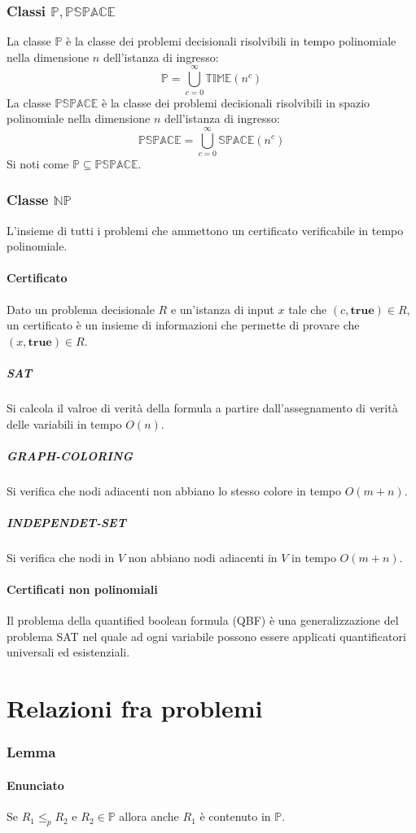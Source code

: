 \subsubsection{Classi $\mathbf{\mathbb{P}}, \mathbf{\mathbb{PSPACE}}$}
La classe $\mathbb{P}$ \`e la classe dei problemi decisionali risolvibili in tempo polinomiale nella dimensione $n$ dell'istanza di ingresso:
$$\mathbb{P} = \bigcup\limits_{c=0}^\infty\mathbb{TIME}(n^c)$$
La classe $\mathbb{PSPACE}$ \`e la classe dei problemi decisionali risolvibili in spazio polinomiale nella dimensione $n$ dell'istanza di ingresso:
$$\mathbb{PSPACE}=\bigcup\limits_{c=0}^\infty\mathbb{SPACE}(n^c)$$
Si noti come $\mathbb{P}\subseteq\mathbb{PSPACE}$.
\subsubsection{Classe $\mathbf{\mathbb{NP}}$}
L'insieme di tutti i problemi che ammettono un certificato verificabile in tempo polinomiale.
\paragraph{Certificato}
Dato un problema decisionale $R$ e un'istanza di input $x$ tale che $(c, \mathbf{true})\in R$, un certificato \`e un insieme di informazioni che permette di provare che $(x, 
\mathbf{true})\in R$.
\subparagraph{SAT}
Si calcola il valroe di verit\`a della formula a partire dall'assegnamento di verit\`a delle variabili in tempo $O(n)$.
\subparagraph{GRAPH-COLORING}
Si verifica che nodi adiacenti non abbiano lo stesso colore in tempo $O(m+n)$.
\subparagraph{INDEPENDET-SET}	
Si verifica che nodi in $V$ non abbiano nodi adiacenti in $V$ in tempo $O(m+n)$.
\paragraph{Certificati non polinomiali}
Il problema della quantified boolean formula (QBF) \`e una generalizzazione del problema SAT nel quale ad ogni variabile possono essere applicati quantificatori universali ed 
esistenziali.
\section{Relazioni fra problemi}
\subsubsection{Lemma}
\paragraph{Enunciato}
Se $R_1\le_p R_2$ e $R_2\in\mathbb{P}$ allora anche $R_1$ \`e contenuto in $\mathbb{P}$.
